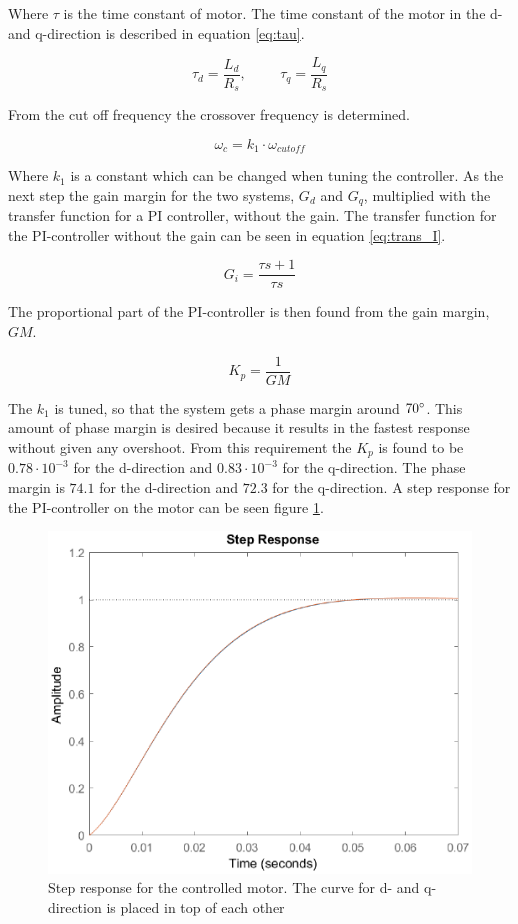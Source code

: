 Where $\tau$ is the time constant of motor. The time constant of the motor in the d- and q-direction is described in equation \ref{eq:tau}.

\begin{equation}
    \label{eq:tau}
    \tau_d = \frac{L_d}{R_s}
    , \hspace{1cm}
    \tau_q = \frac{L_q}{R_s}
\end{equation}

From the cut off frequency the crossover frequency is determined.

\begin{equation}
    \label{eq:crossover}
     \omega_c = k_1 \cdot \omega_{cutoff}
\end{equation}

Where $k_1$ is a constant which can be changed when tuning the controller.
As the next step the gain margin for the two systems, $G_d$ and $G_q$, multiplied with the transfer function for a PI controller, without the gain. The transfer function for the PI-controller without the gain can be seen in equation \ref{eq:trans_I}.

\begin{equation}
    \label{eq:trans_I}
    G_i = \frac{\tau s + 1}{\tau s}
\end{equation}

The proportional part of the PI-controller is then found from the gain margin, $GM$.

\begin{equation}
    \label{eq:gain}
    K_p = \frac{1}{GM} 
\end{equation}

The $k_1$ is tuned, so that the system gets a phase margin around $70 \degree$. This amount of phase margin is desired because it results in the fastest response without given any overshoot. From this requirement the $K_p$ is found to be $0.78 \cdot 10^{-3}$ for the d-direction and $0.83 \cdot 10^{-3}$ for the q-direction. The phase margin is $74.1$ for the d-direction and $72.3$ for the q-direction.
A step response for the PI-controller on the motor can be seen figure \ref{fig:step}.

\begin{figure}[H]
	\centering
	\includegraphics[width=0.6\linewidth]{pictures/control/step_PI.eps}
	\caption{Step response for the controlled motor. The curve for d- and q-direction is placed in top of each other}
	\label{fig:step}
\end{figure}





